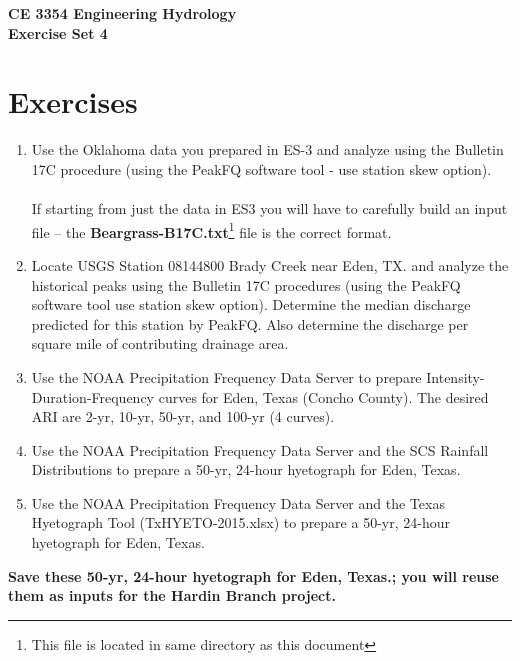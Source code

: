 \documentclass[12pt]{article}
\begin{document}
\begin{center}
{\textbf{{ CE 3354 Engineering Hydrology} \\ {Exercise Set 4}}}
\end{center}

\section*{\small{Exercises}}
\begin{enumerate}
\item Use the Oklahoma data you prepared in ES-3 and analyze using the Bulletin 17C procedure (using the PeakFQ software tool - use station skew option).   \\~\\ If starting from just the data in ES3 you will have to carefully build an input file -- the \textbf{Beargrass-B17C.txt}\footnote{This file is located in same directory as this document} file is the correct format. 

\item  Locate USGS Station 08144800 Brady Creek near Eden, TX. and analyze the historical peaks using the Bulletin 17C procedures (using the PeakFQ software tool use station skew option).  Determine the median discharge predicted for this station by PeakFQ.  Also determine the discharge per square mile of contributing drainage area.

\item  Use the NOAA Precipitation Frequency Data Server to prepare Intensity-Duration-Frequency curves for Eden, Texas (Concho County).   The desired ARI are 2-yr, 10-yr, 50-yr, and 100-yr (4 curves).\\

\item Use the NOAA Precipitation Frequency Data Server and the SCS Rainfall Distributions to prepare a 50-yr, 24-hour hyetograph for Eden, Texas.\\

\item Use the NOAA Precipitation Frequency Data Server and the Texas Hyetograph Tool (TxHYETO-2015.xlsx) to prepare a 50-yr, 24-hour hyetograph for Eden, Texas.\\

\end{enumerate}

\textbf{Save these 50-yr, 24-hour hyetograph for Eden, Texas.; you will reuse them as inputs for the Hardin Branch project.}

\clearpage
\end{document}
